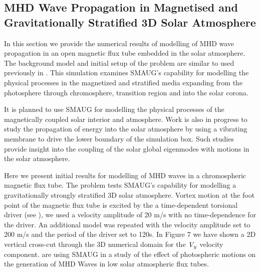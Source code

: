 

 

\subsection{MHD Wave Propagation in Magnetised and Gravitationally Stratified 3D Solar Atmosphere}

In this section we provide the numerical results of modelling of MHD wave propagation in an open magnetic flux tube embedded in the solar atmosphere. The background model and initial setup of the problem are similar to used previously in \citep{Fedun et al. 2011, Fedun et al. 2011c, Fedun et al. 2011b}. This simulation examines SMAUG's capability for modelling the physical processes in the magnetized and stratified media expanding from the photosphere through chromosphere, transition region and into the solar corona.


It is planned to use SMAUG for modelling the physical processes of the magnetically coupled solar interior and atmosphere. Work is also in progress to study the propagation of energy into the solar atmosphere  by using a vibrating membrane to drive the lower boundary of the simulation box. Such studies provide insight into the coupling of the solar global eigenmodes with motions in the solar atmosphere. 

Here we present initial results for modelling of MHD waves in a chromospheric magnetic flux tube. The problem tests SMAUG's capability for modelling a gravitationally strongly stratified 3D solar atmosphere. Vortex motion at the foot point of the magnetic flux tube is excited by the a time-dependent torsional driver (see \citep{Fedun et al. 2011, Fedun et al. 2011c, Fedun et al. 2011b}), we used a velocity amplitude of 20 m/s with no time-dependence for the driver. An additional model was repeated with the velocity amplitude set to 200 m/s and the period of the driver set to 120s.  In Figure 7 we have shown a 2D vertical cross-cut through the 3D numerical domain for the $\it V_{y}$ velocity component. \citep{Mumford et al. 2014} are using SMAUG in a study of the effect of photospheric motions on the generation of MHD Waves in low solar atmospheric flux tubes. 



